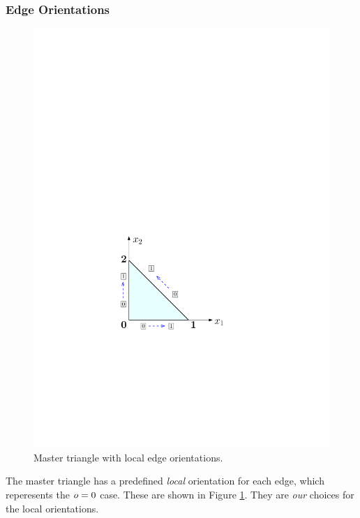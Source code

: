\subsubsection{Edge Orientations}
\label{sec:TriaEdgeOrientations}

\begin{figure}[!ht]
\begin{center}
\includegraphics[scale=0.5]{./figures/MasterTriOrientations.pdf}
\caption{Master triangle with local edge orientations.}
\label{fig:MasterTriOrientations}
\end{center}
\end{figure}

The master triangle has a predefined \textit{local} orientation for each edge, which reperesents the $o=0$ case. 
These are shown in Figure \ref{fig:MasterTriOrientations}.
They are \textit{our} choices for the local orientations.


